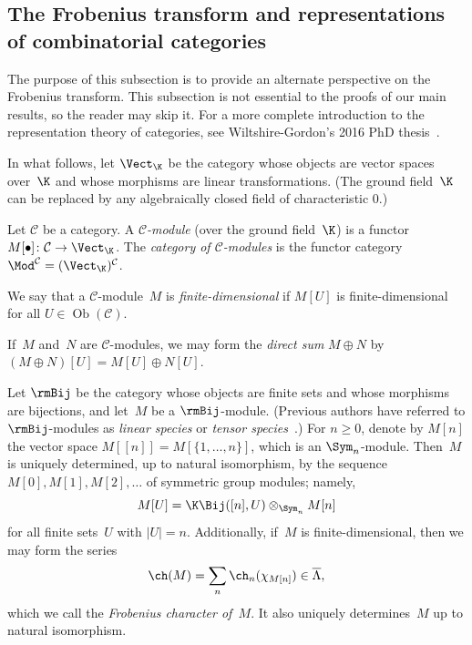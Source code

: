 \subsection{The Frobenius transform and representations of combinatorial categories}\label{subsection:category}
The purpose of this subsection is to provide an alternate perspective on the Frobenius transform. This subsection is not essential to the proofs of our main results, so the reader may skip it. For a more complete introduction to the representation theory of categories, see Wiltshire-Gordon's 2016 PhD thesis~\cite{MR3641124}.

In what follows, let $\Vect_\K$ be the category whose objects are vector spaces over~$\K$ and whose morphisms are linear transformations. (The ground field~$\K$ can be replaced by any algebraically closed field of characteristic $0$.)

\begin{defi}
    Let $\mathcal{C}$ be a category. A \emph{$\mathcal{C}$-module} (over the ground field~$\K$) is a functor $M[\bullet] \colon \mathcal{C} \to \Vect_\K$. The \emph{category of $\mathcal{C}$-modules} is the functor category $\Mod^\mathcal{C} = (\Vect_\K)^\mathcal{C}$.
    
    We say that a $\mathcal{C}$-module~$M$ is \emph{finite-dimensional} if $M[U]$ is finite-dimensional for all $U \in \operatorname{Ob}(\mathcal{C})$.

    If~$M$ and~$N$ are $\mathcal{C}$-modules, we may form the \emph{direct sum} $M \oplus N$ by $(M \oplus N)[U] = M[U] \oplus N[U]$.
\end{defi}

Let $\rmBij$ be the category whose objects are finite sets and whose morphisms are bijections, and let~$M$ be a $\rmBij$-module. (Previous authors have referred to $\rmBij$-modules as \emph{linear species} or \emph{tensor species}~\cite{MR0927763, MR1132426}.) For $n \geq 0$, denote by $M[n]$ the vector space $M[[n]] = M[\{1, \ldots, n\}]$, which is an $\Sym_n$-module. Then~$M$ is uniquely determined, up to natural isomorphism, by the sequence $M[0], M[1], M[2], \ldots$ of symmetric group modules; namely, 
\begin{equation}\label{equation:bmodule}
M[U] = \K \Bij([n], U) \otimes_{\Sym_n} M[n]
\end{equation} for all finite sets~$U$ with $|U| = n$.
Additionally, if~$M$ is finite-dimensional, then we may form the series
\[\ch(M) = \sum_{n} \ch_n(\chi_{M[n]}) \in \overline{\Lambda},\] which we call the \emph{Frobenius character of~$M$}. It also uniquely determines~$M$ up to natural isomorphism.

